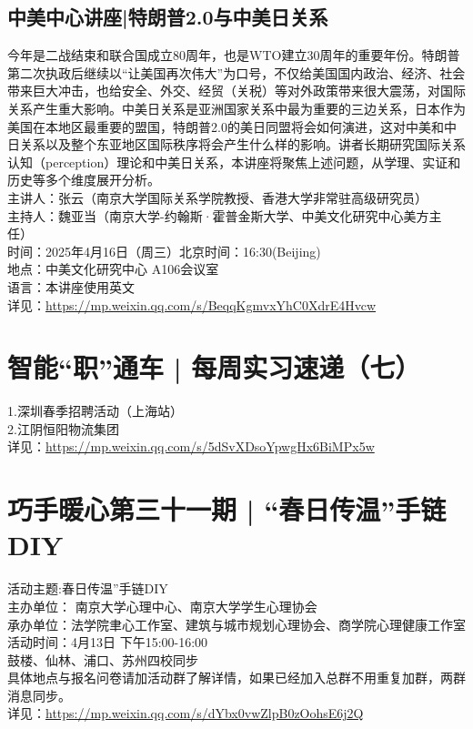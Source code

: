 \documentclass[letterpaper, 12pt]{article}
\begin{document}
\begin{multicols}{2}
\subsection{中美中心讲座|特朗普2.0与中美日关系}
今年是二战结束和联合国成立80周年，也是WTO建立30周年的重要年份。特朗普第二次执政后继续以“让美国再次伟大”为口号，不仅给美国国内政治、经济、社会带来巨大冲击，也给安全、外交、经贸（关税）等对外政策带来很大震荡，对国际关系产生重大影响。中美日关系是亚洲国家关系中最为重要的三边关系，日本作为美国在本地区最重要的盟国，特朗普2.0的美日同盟将会如何演进，这对中美和中日关系以及整个东亚地区国际秩序将会产生什么样的影响。讲者长期研究国际关系认知（perception）理论和中美日关系，本讲座将聚焦上述问题，从学理、实证和历史等多个维度展开分析。
\\主讲人：张云（南京大学国际关系学院教授、香港大学非常驻高级研究员）
\\主持人：魏亚当（南京大学-约翰斯·霍普金斯大学、中美文化研究中心美方主任）
\\时间：2025年4月16日（周三）北京时间：16:30(Beijing)
\\地点：中美文化研究中心 A106会议室
\\语言：本讲座使用英文
\\详见：\url{https://mp.weixin.qq.com/s/BeqqKgmvxYhC0XdrE4Hvcw}

\section{智能“职”通车 | 每周实习速递（七）}
1.深圳春季招聘活动（上海站）
\\2.江阴恒阳物流集团
\\详见：\url{https://mp.weixin.qq.com/s/5dSvXDsoYpwgHx6BiMPx5w}

\section{巧手暖心第三十一期 | “春日传温”手链DIY}
活动主题:春日传温”手链DIY
\\主办单位： 南京大学心理中心、南京大学学生心理协会
\\承办单位：法学院聿心工作室、建筑与城市规划心理协会、商学院心理健康工作室
\\活动时间：4月13日 下午15:00-16:00
\\鼓楼、仙林、浦口、苏州四校同步
\\具体地点与报名问卷请加活动群了解详情，如果已经加入总群不用重复加群，两群消息同步。
\\详见：\url{https://mp.weixin.qq.com/s/dYbx0vwZlpB0zOohsE6j2Q}


\end{multicols}
\end{document}
